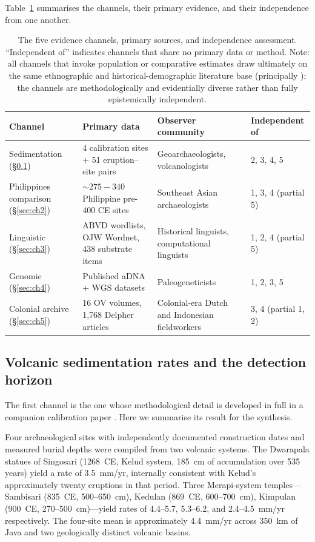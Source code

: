 \documentclass[12pt,a4paper]{article}
\begin{document}
Table~\ref{tab:channels} summarises the channels, their primary evidence, and their independence from one another.

\begin{table}[t]
\caption{The five evidence channels, primary sources, and independence assessment. ``Independent of'' indicates channels that share no primary data or method. Note: all channels that invoke population or comparative estimates draw ultimately on the same ethnographic and historical-demographic literature base (principally \citealp{bellwood2017,reid1988,kirch2000,higham2014}); the channels are methodologically and evidentially diverse rather than fully epistemically independent.}
\label{tab:channels}
\begin{tabular}{p{2.5cm}p{4.5cm}p{4cm}p{3cm}}
\toprule
Channel & Primary data & Observer community & Independent of \\
\midrule
Sedimentation (\S\ref{sec:ch1}) & 4 calibration sites + 51 eruption--site pairs & Geoarchaeologists, volcanologists & 2, 3, 4, 5 \\
Philippines comparison (\S\ref{sec:ch2}) & ${\sim}275{-}340$ Philippine pre-400 CE sites & Southeast Asian archaeologists & 1, 3, 4 (partial 5) \\
Linguistic (\S\ref{sec:ch3}) & ABVD wordlists, OJW Wordnet, 438 substrate items & Historical linguists, computational linguists & 1, 2, 4 (partial 5) \\
Genomic (\S\ref{sec:ch4}) & Published aDNA + WGS datasets & Paleogeneticists & 1, 2, 3, 5 \\
Colonial archive (\S\ref{sec:ch5}) & 16 OV volumes, 1{,}768 Delpher articles & Colonial-era Dutch and Indonesian fieldworkers & 3, 4 (partial 1, 2) \\
\bottomrule
\end{tabular}
\end{table}

\subsection{Volcanic sedimentation rates and the detection horizon}
\label{sec:ch1}

The first channel is the one whose methodological detail is developed in full in a companion calibration paper \citep{amien_p1core}. Here we summarise its result for the synthesis.

Four archaeological sites with independently documented construction dates and measured burial depths were compiled from two volcanic systems. The Dwarapala statues of Singosari (1268~CE, Kelud system, 185~cm of accumulation over 535 years) yield a rate of 3.5~mm/yr, internally consistent with Kelud's approximately twenty eruptions in that period. Three Merapi-system temples---Sambisari (835~CE, 500--650~cm), Kedulan (869~CE, 600--700~cm), Kimpulan (900~CE, 270--500~cm)---yield rates of 4.4--5.7, 5.3--6.2, and 2.4--4.5~mm/yr respectively. The four-site mean is approximately 4.4~mm/yr across 350~km of Java and two geologically distinct volcanic basins.
\end{document}
